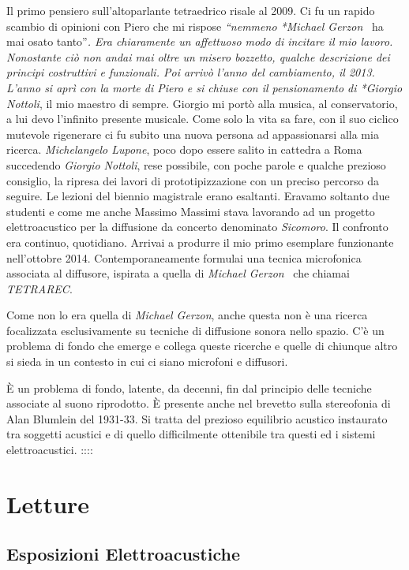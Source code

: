 \documentclass[a4paper,11pt]{article}
\begin{document}
Il primo pensiero sull'altoparlante tetraedrico risale al 2009. Ci fu un
rapido scambio di opinioni con Piero che mi rispose \emph{``nemmeno *Michael
Gerzon}  ha mai osato tanto''\emph{. Era chiaramente un affettuoso modo di
incitare il mio lavoro. Nonostante ciò non andai mai oltre un misero
bozzetto, qualche descrizione dei principi costruttivi e funzionali. Poi
arrivò l'anno del cambiamento, il 2013. L'anno si aprì con la morte di
Piero e si chiuse con il pensionamento di *Giorgio Nottoli}, il mio
maestro di sempre. Giorgio mi portò alla musica, al conservatorio, a lui
devo l'infinito presente musicale. Come solo la vita sa fare, con il suo
ciclico mutevole rigenerare ci fu subito una nuova persona ad
appassionarsi alla mia ricerca. \emph{Michelangelo Lupone}, poco dopo essere
salito in cattedra a Roma succedendo \emph{Giorgio Nottoli}, rese possibile,
con poche parole e qualche prezioso consiglio, la ripresa dei lavori di
prototipizzazione con un preciso percorso da seguire. Le lezioni del
biennio magistrale erano esaltanti. Eravamo soltanto due studenti e come
me anche Massimo Massimi stava lavorando ad un progetto elettroacustico
per la diffusione da concerto denominato \emph{Sicomoro}. Il confronto era
continuo, quotidiano. Arrivai a produrre il mio primo esemplare
funzionante nell'ottobre 2014. Contemporaneamente formulai una tecnica
microfonica associata al diffusore, ispirata a quella di \emph{Michael
Gerzon}  che chiamai \emph{TETRAREC}.

Come non lo era quella di \emph{Michael Gerzon}, anche questa non è una
ricerca focalizzata esclusivamente su tecniche di diffusione sonora
nello spazio. C'è un problema di fondo che emerge e collega queste
ricerche e quelle di chiunque altro si sieda in un contesto in cui ci
siano microfoni e diffusori.

È un problema di fondo, latente, da decenni, fin dal principio delle
tecniche associate al suono riprodotto. È presente anche nel brevetto
sulla stereofonia di Alan Blumlein del 1931-33. Si tratta del prezioso
equilibrio acustico instaurato tra soggetti acustici e di quello
difficilmente ottenibile tra questi ed i sistemi elettroacustici.
::::

\section{Letture}\hypertarget{letture}{}\label{letture}

\subsection{Esposizioni Elettroacustiche}\hypertarget{esposizioni-elettroacustiche}{}\label{esposizioni-elettroacustiche}
\end{document}
